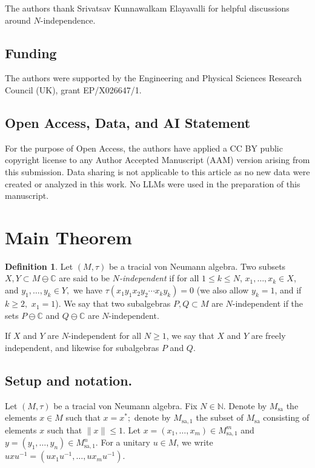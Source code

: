 \documentclass[10pt]{amsart}
\numberwithin{equation}{section}
\theoremstyle{definition}
\newtheorem{defn}[thm]{Definition}
\newcommand{\N}{\mathbb{N}}
\newcommand{\C}{\mathbb{C}}
\begin{document}
The authors thank Srivatsav Kunnawalkam Elayavalli for helpful discussions around $N$-independence.

\subsection*{Funding}

The authors were supported by the Engineering and Physical Sciences Research Council (UK), grant EP/X026647/1.  

\subsection*{Open Access, Data, and AI Statement}

For the purpose of Open Access, the authors have applied a CC BY public copyright license to any Author Accepted Manuscript (AAM) version arising from this submission. Data sharing is not applicable to this article as no new data were created or analyzed in this work. No LLMs were used in the preparation of this manuscript.


\section{Main Theorem}

\begin{defn} Let $(M,\tau)$ be a tracial von Neumann algebra. Two subsets $X,Y \subset M \ominus \C$ are said to be \emph{$N$-independent} if for all $1\le k\le N$, $x_1,\ldots,x_k\in X$, and $y_1,\ldots,y_k\in Y,$ we have $\tau(x_1y_1x_2y_2\cdots x_ky_k)=0$ (we also allow $y_k = 1$, and if $k\geq 2,$ $x_1=1$). We say that two subalgebras $P,Q\subset M$ are $N$-independent if the sets $P\ominus \C$ and $Q\ominus \C$ are $N$-independent.

If $X$ and $Y$ are $N$-independent for all $N\ge1$, we say that $X$ and $Y$ are freely independent, and likewise for subalgebras $P$ and $Q$.
    
\end{defn}


\subsection*{Setup and notation.}

Let $(M,\tau)$ be a tracial von Neumann algebra. Fix $N\in \N.$ Denote by $M_{\mathrm{sa}}$ the elements $x\in M$ such that $x=x^*;$ denote by $M_{\mathrm{sa},1  }$ the subset of $M_{\mathrm{sa}}$ consisting of elements $x$ such that $\|x\|\le 1.$ Let $x = (x_1,\ldots,x_m)\in M_{\mathrm{sa},1}^m$ and $y = (y_1,\ldots,y_n)\in M_{\mathrm{sa},1}^n$. For a unitary $u\in M$, we write $uxu^{-1} = (ux_1u^{-1},\ldots,ux_mu^{-1})$.
\end{document}
